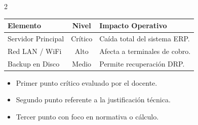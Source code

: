 \documentclass[9pt,a4paper,twoside]{extarticle}
\begin{document}
\begin{multicols*}{2}
\begin{center}
\renewcommand{\arraystretch}{1.15}
\fontsize{7.5pt}{9pt}\selectfont
\begin{tabularx}{\columnwidth}{l c X}
\toprule
\textbf{Elemento} & \textbf{Nivel} & \textbf{Impacto Operativo} \\
\midrule
Servidor Principal & Crítico & Caída total del sistema ERP. \\
Red LAN / WiFi & Alto & Afecta a terminales de cobro. \\
Backup en Disco & Medio & Permite recuperación DRP. \\
\bottomrule
\end{tabularx}
\end{center}

\begin{summarybox}
\begin{itemize}
    \item Primer punto crítico evaluado por el docente.
    \item Segundo punto referente a la justificación técnica.
    \item Tercer punto con foco en normativa o cálculo.
\end{itemize}
\end{summarybox}

\end{multicols*}
\end{document}
